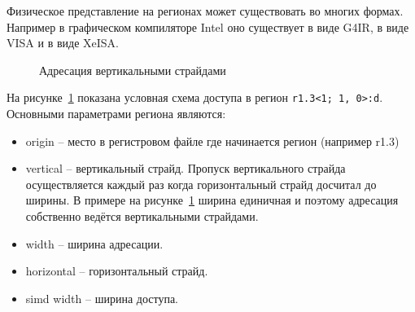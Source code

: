 Физическое представление на регионах может существовать во многих формах. Например в графическом компиляторе Intel оно существует в виде G4IR, в виде VISA и в виде XeISA.

\begin{figure}[ht]
    \caption{Адресация вертикальными страйдами}\label{fig:genisa-addressing-reg1}
\end{figure}

На рисунке~\cref{fig:genisa-addressing-reg1} показана условная схема доступа в регион \lstinline!r1.3<1; 1, 0>:d!. Основными параметрами региона являются:

\begin{itemize}
\item origin -- место в регистровом файле где начинается регион (например r1.3)
\item vertical -- вертикальный страйд. Пропуск вертикального страйда осуществляется каждый раз когда горизонтальный страйд досчитал до ширины. В примере на рисунке~\cref{fig:genisa-addressing-reg1} ширина единичная и поэтому адресация собственно ведётся вертикальными страйдами.
\item width -- ширина адресации.
\item horizontal -- горизонтальный страйд.
\item simd width -- ширина доступа.
\end{itemize}


